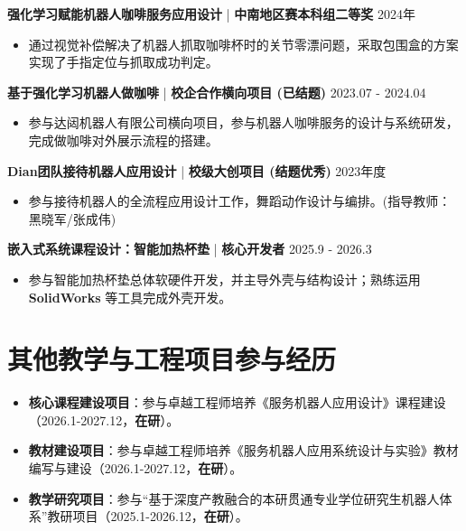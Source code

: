 \documentclass[10pt, a4paper]{ctexart}
\begin{document}
\vspace{0.2em}
\textbf{强化学习赋能机器人咖啡服务应用设计} | \textbf{中南地区赛本科组二等奖} \hfill 2024年
\begin{itemize}
    \item 通过视觉补偿解决了机器人抓取咖啡杯时的关节零漂问题，采取包围盒的方案实现了手指定位与抓取成功判定。
\end{itemize}

\vspace{0.2em}
\textbf{基于强化学习机器人做咖啡} | \textbf{校企合作横向项目 (已结题)} \hfill 2023.07 - 2024.04
\begin{itemize}
    \item 参与达闼机器人有限公司横向项目，参与机器人咖啡服务的设计与系统研发，完成做咖啡对外展示流程的搭建。
\end{itemize}

\vspace{0.2em}
\textbf{Dian团队接待机器人应用设计} | \textbf{校级大创项目 (结题优秀)} \hfill 2023年度
\begin{itemize}
    \item 参与接待机器人的全流程应用设计工作，舞蹈动作设计与编排。(指导教师：黑晓军/张成伟)
\end{itemize}

\vspace{0.2em}
\textbf{嵌入式系统课程设计：智能加热杯垫} | \textbf{核心开发者} \hfill 2025.9 - 2026.3
\begin{itemize}
    \item 参与智能加热杯垫总体软硬件开发，并主导外壳与结构设计；熟练运用 \textbf{SolidWorks} 等工具完成外壳开发。
\end{itemize}

\section{其他教学与工程项目参与经历}
\begin{itemize}
    \item \textbf{核心课程建设项目}：参与卓越工程师培养《服务机器人应用设计》课程建设（2026.1-2027.12，\textbf{在研}）。
    \item \textbf{教材建设项目}：参与卓越工程师培养《服务机器人应用系统设计与实验》教材编写与建设（2026.1-2027.12，\textbf{在研}）。
    \item \textbf{教学研究项目}：参与“基于深度产教融合的本研贯通专业学位研究生机器人体系”教研项目（2025.1-2026.12，\textbf{在研}）。
\end{itemize}
\end{document}
